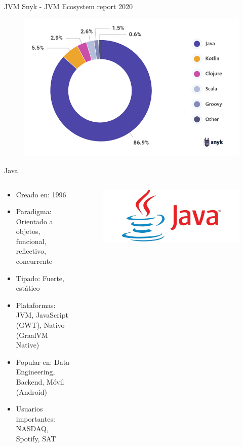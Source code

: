 \documentclass[aspectratio=169]{beamer}
\begin{document}
\begin{frame}{JVM}
	Snyk - JVM Ecosystem report 2020

	\begin{figure}
		\centering
		\includegraphics[width=0.7\linewidth]{Images/jvmlangs}
	\end{figure}

\end{frame}

\begin{frame}{Java}
	\begin{columns}[T] %
		\begin{column}[T]{0.5\textwidth} %
			\begin{itemize}
				\item Creado en: 1996
				\item Paradigma: Orientado a objetos, funcional, reflectivo, concurrente
				\item Tipado: Fuerte, estático
				\item Plataformas: JVM, JavaScript (GWT), Nativo (GraalVM Native)
                \item Popular en: Data Engineering, Backend, Móvil (Android)
				\item Usuarios importantes: NASDAQ, Spotify, SAT
			\end{itemize}
		\end{column}
		\begin{column}[T]{7cm} %
			\begin{figure}
				\centering
				\includegraphics[width=\linewidth]{Images/java}
			\end{figure}

		\end{column}
	\end{columns}
\end{frame}
\end{document}
